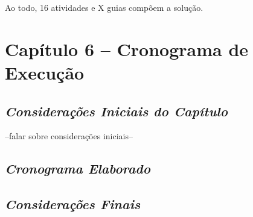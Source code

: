 Ao todo, 16 atividades e X guias compõem a solução.

\chapter[Capítulo 6]{Capítulo 6 – Cronograma de Execução}

\section{\textit{Considerações Iniciais do Capítulo}}

--falar sobre considerações iniciais--

\section{\textit{Cronograma Elaborado}}

\section{\textit{Considerações Finais}}